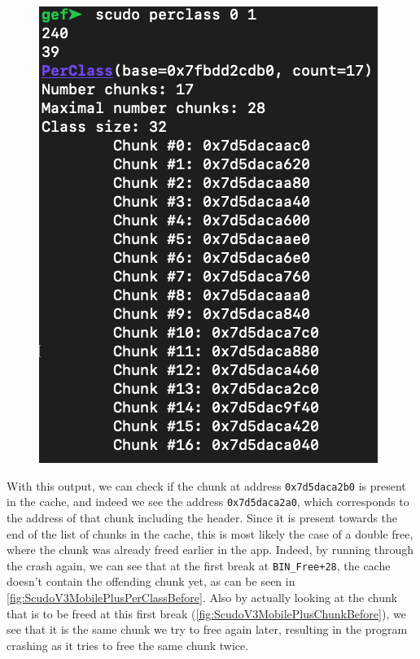 \documentclass[a4paper,11pt,oneside]{report}
\begin{document}
\begin{figure}[h!]
\begin{minipage}{.5\textwidth}
  \label{fig:ScudoV3MobilePlusPerClassAfter}
\end{minipage}%
\begin{minipage}{.5\textwidth}
  \centering
  \includegraphics[width=.95\linewidth]{figures/ScudoV3MobilePlusPerClassBefore.png}
  \label{fig:ScudoV3MobilePlusPerClassBefore}
\end{minipage}
\end{figure}

With this output, we can check if the chunk at address \verb|0x7d5daca2b0| is
present in the cache, and indeed we see the address \verb|0x7d5daca2a0|, which
corresponds to the address of that chunk including the header. Since it is
present towards the end of the list of chunks in the cache, this is most likely
the case of a double free, where the chunk was already freed earlier in the app.
Indeed, by running through the crash again, we can see that at the first break at
\verb|BIN_Free+28|, the cache doesn't contain the offending chunk yet, as can be
seen in \autoref{fig:ScudoV3MobilePlusPerClassBefore}. Also by actually looking
at the chunk that is to be freed at this first break (\autoref{fig:ScudoV3MobilePlusChunkBefore}),
we see that it is the same chunk we try to free again later, resulting in the
program crashing as it tries to free the same chunk twice.
\end{document}
